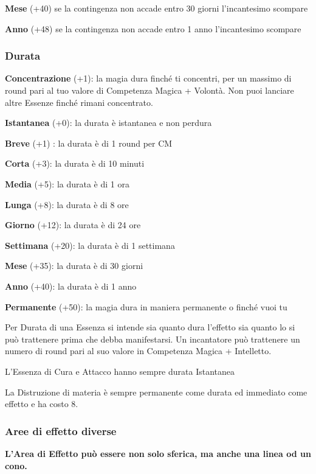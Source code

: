 \documentclass[a4paper,11pt,twoside,openany]{book}
\begin{document}
\textbf{Mese} (+40) se la contingenza non accade entro 30 giorni l'incantesimo scompare

\textbf{Anno} (+48) se la contingenza non accade entro 1 anno l'incantesimo scompare

\subsubsection{Durata}

\label{durata}

\textbf{Concentrazione} (+1): la magia dura finché ti concentri, per un massimo di round pari al tuo valore di Competenza Magica + Volontà. Non puoi lanciare altre Essenze finché rimani concentrato.

\textbf{Istantanea} (+0): la durata è istantanea e non perdura

\textbf{Breve} (+1) : la durata è di 1 round per CM

\textbf{Corta} (+3): la durata è di 10 minuti

\textbf{Media} (+5): la durata è di 1 ora

\textbf{Lunga} (+8): la durata è di 8 ore

\textbf{Giorno} (+12): la durata è di 24 ore

\textbf{Settimana} (+20): la durata è di 1 settimana

\textbf{Mese} (+35): la durata è di 30 giorni

\textbf{Anno} (+40): la durata è di 1 anno

\textbf{Permanente} (+50): la magia dura in maniera permanente o finché vuoi tu

Per Durata di una Essenza si intende sia quanto dura l'effetto sia quanto lo si può trattenere prima che debba manifestarsi. Un incantatore può trattenere un numero di round pari al suo valore in Competenza Magica + Intelletto.

L'Essenza di Cura e Attacco hanno sempre durata Istantanea

La Distruzione di materia è sempre permanente come durata ed immediato come effetto e ha costo 8.

\subsubsection{Aree di effetto diverse}

\label{aree-di-effetto-diverse}

\textbf{L'Area di Effetto può essere non solo sferica, ma anche una linea od un cono.}
\end{document}
